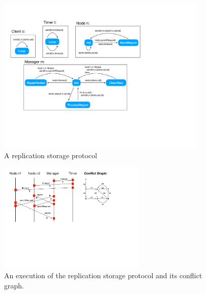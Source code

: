 %

\begin{figure}
\includegraphics[width=10cm]{replication.pdf}
\caption{A replication storage protocol}
\label{fig:replication}
\end{figure}

\begin{figure}
\includegraphics[width=7cm]{MSC-storage.pdf}
\caption{An execution of the replication storage protocol and its conflict graph.}
\label{fig:replic-exec}
\end{figure}
